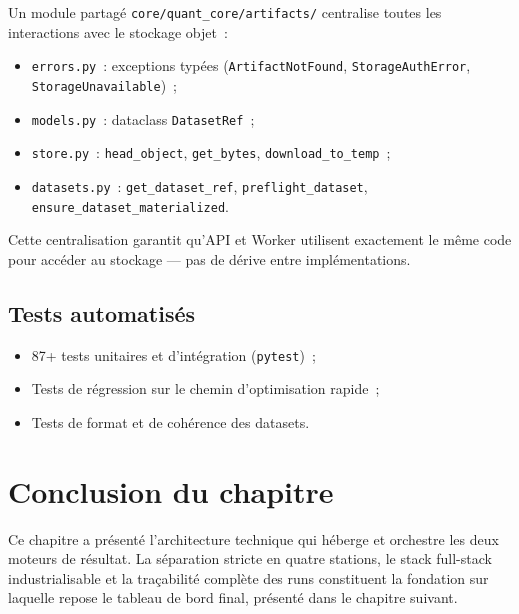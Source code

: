 Un module partagé \texttt{core/quant\_core/artifacts/} centralise toutes les
interactions avec le stockage objet~:

\begin{itemize}
    \item \texttt{errors.py}~: exceptions typées (\texttt{ArtifactNotFound},
    \texttt{StorageAuthError}, \texttt{StorageUnavailable})~;
    \item \texttt{models.py}~: dataclass \texttt{DatasetRef}~;
    \item \texttt{store.py}~: \texttt{head\_object}, \texttt{get\_bytes},
    \texttt{download\_to\_temp}~;
    \item \texttt{datasets.py}~: \texttt{get\_dataset\_ref}, \texttt{preflight\_dataset},
    \texttt{ensure\_dataset\_materialized}.
\end{itemize}

Cette centralisation garantit qu'API et Worker utilisent exactement le même code
pour accéder au stockage — pas de dérive entre implémentations.

\subsection{Tests automatisés}

\begin{itemize}
    \item 87+ tests unitaires et d'intégration (\texttt{pytest})~;
    \item Tests de régression sur le chemin d'optimisation rapide~;
    \item Tests de format et de cohérence des datasets.
\end{itemize}

\section*{Conclusion du chapitre}

Ce chapitre a présenté l'architecture technique qui héberge et orchestre les deux
moteurs de résultat. La séparation stricte en quatre stations, le stack full-stack
industrialisable et la traçabilité complète des runs constituent la fondation sur
laquelle repose le tableau de bord final, présenté dans le chapitre suivant.
